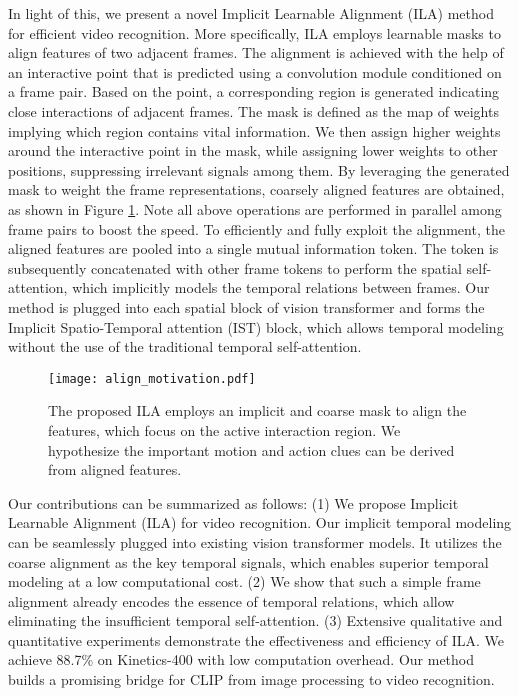 \documentclass[10pt,twocolumn,letterpaper]{article}
\begin{document}
In light of this, we present a novel Implicit Learnable Alignment (ILA) method for efficient video recognition. More specifically, ILA employs learnable masks to align features of two adjacent frames. The alignment is achieved with the help of an interactive point that is predicted using a convolution module conditioned on a frame pair. Based on the point, a corresponding region is generated indicating close interactions of adjacent frames. 
The mask is defined as the map of weights implying which region contains vital information.
We then assign higher weights around the interactive point in the mask, while assigning lower weights to other positions, suppressing irrelevant signals among them.
By leveraging the generated mask to weight the frame representations, coarsely aligned features are obtained, as shown in Figure \ref{fig:comparisons}.
Note all above operations are performed in parallel among frame pairs to boost the speed. To efficiently and fully exploit the alignment, the aligned features are pooled into a single mutual information token.
The token is subsequently concatenated with other frame tokens to perform the spatial self-attention, which implicitly models the temporal relations between frames. Our method is plugged into each spatial block of vision transformer and forms the Implicit Spatio-Temporal attention (IST) block, which allows temporal modeling without the use of the traditional temporal self-attention.


\begin{figure}[t]
\begin{center}
\texttt{[image: align\_motivation.pdf]}
\end{center}
   \caption{The proposed ILA employs an implicit and coarse mask to align the features, which focus on the active interaction region. We hypothesize the important motion and action clues can be derived from aligned features.}
\label{fig:comparisons}
\vspace{-0.2cm}
\end{figure}

Our contributions can be summarized as follows: (1) We propose  Implicit Learnable Alignment (ILA) for video recognition. Our implicit temporal modeling can be seamlessly plugged into existing vision transformer models. It utilizes the coarse alignment as the key temporal signals, which enables superior temporal modeling at a low computational cost.
(2) We show that such a simple frame alignment already encodes the essence of temporal relations, which allow eliminating the insufficient temporal self-attention.
(3) Extensive qualitative and quantitative experiments demonstrate the effectiveness and efficiency of ILA. We achieve 88.7\% on Kinetics-400 with low computation overhead. Our method builds a promising bridge for CLIP from image processing to video recognition.
\end{document}
